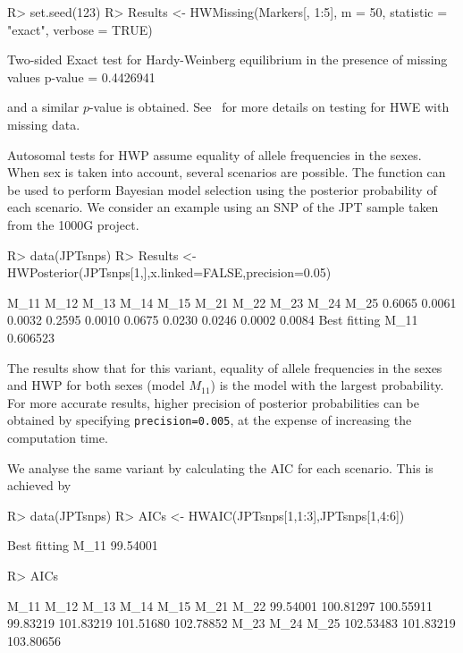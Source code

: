 \documentclass[nojss]{jss}
\begin{document}
\begin{Schunk}
\begin{Sinput}
R> set.seed(123)
R> Results <- HWMissing(Markers[, 1:5], m = 50, statistic = "exact", verbose = TRUE)
\end{Sinput}
\begin{Soutput}
Two-sided Exact test for Hardy-Weinberg equilibrium in the presence of missing values
 p-value =  0.4426941 
\end{Soutput}
\end{Schunk}

and a similar $p$-value is obtained. See~\citet{Graffel24} for more details on
testing for HWE with missing data.

Autosomal tests for HWP assume equality of allele frequencies in the sexes. When sex is taken into account, several scenarios are possible. The function  can be used to perform Bayesian model selection using the posterior probability of each scenario. We consider an example using an SNP of the JPT sample taken from the 1000G project.

\begin{Schunk}
\begin{Sinput}
R> data(JPTsnps)
R> Results <- HWPosterior(JPTsnps[1,],x.linked=FALSE,precision=0.05)
\end{Sinput}
\begin{Soutput}
  M_11   M_12   M_13   M_14   M_15   M_21   M_22   M_23   M_24   M_25 
0.6065 0.0061 0.0032 0.2595 0.0010 0.0675 0.0230 0.0246 0.0002 0.0084 
Best fitting M_11 0.606523 
\end{Soutput}
\end{Schunk}

The results show that for this variant, equality of allele frequencies in the sexes and HWP for both sexes (model $M_{11}$) is the model with the largest probability. For more accurate results, higher precision of posterior probabilities can be obtained by specifying {\tt precision=0.005}, at the expense of increasing the computation time.

We analyse the same variant by calculating the AIC for each scenario. This is achieved by

\begin{Schunk}
\begin{Sinput}
R> data(JPTsnps)
R> AICs <- HWAIC(JPTsnps[1,1:3],JPTsnps[1,4:6])
\end{Sinput}
\begin{Soutput}
Best fitting M_11 99.54001 
\end{Soutput}
\begin{Sinput}
R> AICs
\end{Sinput}
\begin{Soutput}
     M_11      M_12      M_13      M_14      M_15      M_21      M_22 
 99.54001 100.81297 100.55911  99.83219 101.83219 101.51680 102.78852 
     M_23      M_24      M_25 
102.53483 101.83219 103.80656 
\end{Soutput}
\end{Schunk}
\end{document}
